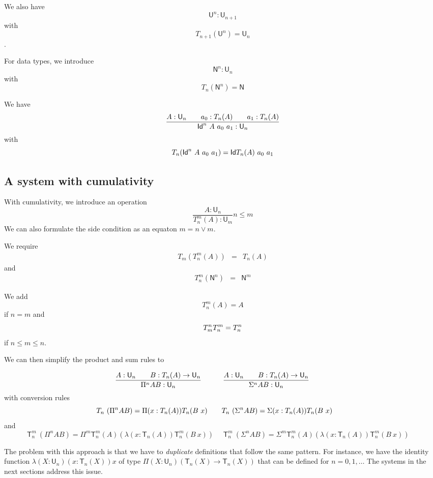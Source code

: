 \documentclass[11pt,a4paper]{article}
\newcommand{\Id}{\mathsf{Id}}
\def\NN{\mathsf{N}}
\def\UU{\mathsf{U}}
\newcommand{\T}{\mathsf{T}}
\begin{document}
We also have $${\UU^{n}}:\UU_{n + 1}$$ with
$$T_{n + 1}({\UU^{n}}) = \UU_{n}$$.

For data types, we introduce $$\NN^{n}:\UU_{n}$$ with
$$T_{n}(\NN^{n}) = \NN$$

We have 
$$
\frac{A:\UU_n~~~~~~a_0:\\T_n(A)~~~~~~a_1:\\T_n(A)}
{\Id^n~A~a_0~a_1:\UU_n}
$$ 
with $$\\T_n(\Id^n~A~a_0~a_1) = \Id~\\T_n(A)~a_0~a_1$$

\subsection*{A system with cumulativity}

With cumulativity, we introduce an operation 
$$
\frac{A:\UU_{n}}
{T_{n}^{m}(A):\UU_{m}}
n\leqslant m
$$
We can also formulate the side condition as an equaton $m = n \vee m$.

We require
\begin{eqnarray*}
T_m(T_{n}^{m}(A)) &=& T_{n}(A)
\end{eqnarray*}
and
\begin{eqnarray*}
T_{n}^{m}(\NN^{n}) &=& \NN^{m}
\end{eqnarray*}

We add $$
T_{n}^m(A) = A
$$
if $n = m$
and $$T_{m}^n\\T_{n}^m = T_n^n$$ if $n\leqslant m\leqslant n$.

We can then simplify the product and sum rules to

$$
\frac{A:\UU_{n}~~~~~~B:\\T_{n}(A)\rightarrow \UU_{n}}
     {\Pi^{n} A B:\UU_{n}}~~~~~~~~~
\frac{A:\UU_{n}~~~~~~B:\\T_{n}(A)\rightarrow \UU_{n}}
     {\Sigma^{n} A B:\UU_{n}}~~~~~~~~~
$$
with conversion rules
$$
\\T_{n}~(\Pi^{n} A B) = \Pi (x:\\T_{n}(A)) \\T_{n}(B~x)~~~~~~~
\\T_{n}~(\Sigma^{n} A B) = \Sigma (x:\\T_{n}(A)) \\T_{n}(B~x)~~~~~~~
$$
and
$$
\T_{n}^{m}~(\Pi^{n} A B) = \Pi^{m} \T_{n}^{m}(A) (\lambda (x:\T_{n}(A))\T_{n}^{m}(B~x))~~~~~~
\T_{n}^{m}~(\Sigma^{n} A B) = \Sigma^{m} \T_{n}^{m}(A) (\lambda (x:\T_{n}(A))\T_{n}^{m}(B~x))~~~~~~
$$

The problem with this approach is that we have to {\em duplicate} definitions that follow
the same pattern. For instance, we have the identity function $\lambda (X:\UU_n)(x:\T_n(X))x$
of type $\Pi (X:\UU_n)(\T_n(X)\rightarrow \T_n(X))$ that can be defined for $n = 0,1,\dots$
The systems in the next sections address this issue.
\end{document}
